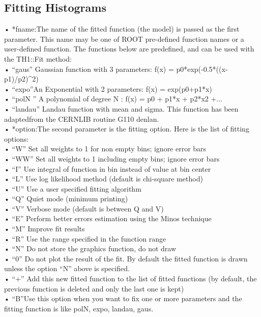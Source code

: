 \documentclass[11pt,a4paper,titlepage]{article}
\begin{document}
{\subsection{Fitting Histograms} %
• *fname:The name of the fitted function (the model) is passed as the first parameter. This name may be one of ROOT pre-defined function names or a user-defined function. The functions below are predefined, and can be used with the TH1::Fit method:\\
• “gaus” Gaussian function with 3 parameters: f(x) = p0*exp(-0.5*((x-p1)/p2)\^{}2)\\
• “expo”An Exponential with 2 parameters: f(x) = exp(p0+p1*x)\\
• “polN ” A polynomial of degree N : f(x) = p0 + p1*x + p2*x2 +...\\
• “landau” Landau function with mean and sigma. This function has been adaptedfrom the CERNLIB routine G110 denlan.\\
• *option:The second parameter is the fitting option. Here is the list of fitting options:\\
• “W” Set all weights to 1 for non empty bins; ignore error bars\\
• “WW” Set all weights to 1 including empty bins; ignore error bars\\
• “I” Use integral of function in bin instead of value at bin center\\
• “L” Use log likelihood method (default is chi-square method)\\
• “U” Use a user specified fitting algorithm\\
• “Q” Quiet mode (minimum printing)\\
• “V” Verbose mode (default is between Q and V)\\
• “E” Perform better errors estimation using the Minos technique\\
• “M” Improve fit results\\
• “R” Use the range specified in the function range\\
• “N” Do not store the graphics function, do not draw\\
• “0” Do not plot the result of the fit. By default the fitted function is drawn unless the option “N” above is specified.\\
• “+” Add this new fitted function to the list of fitted functions (by default, the previous function is deleted and only the last one is kept)\\
• “B”Use this option when you want to fix one or more parameters and the fitting function is like polN, expo, landau, gaus.\\
}
\end{document}

